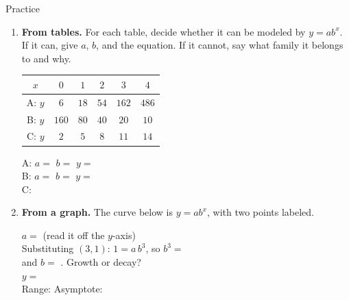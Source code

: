 \documentclass[10pt]{article}
\newcommand{\lgrid}[4]{%
  \draw[step=1, linegray!40, very thin] (#1,#3) grid (#2,#4);
  \draw[->, semithick, charcoal] (#1,0)--(#2,0) node[below right, font=\scriptsize]{$x$};
  \draw[->, semithick, charcoal] (0,#3)--(0,#4) node[left, font=\scriptsize]{$y$};}
\newcommand{\expcurve}[4]{\draw[very thick, forest, domain=#3:#4, samples=120, smooth]
  plot (\x,{#1*exp((#2)*(\x))});}
\begin{document}
\begin{notesbox}{Practice}
\begin{enumerate}[leftmargin=1.9em, itemsep=12pt]
  \item \textbf{From tables.} For each table, decide whether it can be modeled by $y=ab^{x}$. If it
    can, give $a$, $b$, and the equation. If it cannot, say what family it belongs to and why.
    \begin{center}
    \renewcommand{\arraystretch}{1.25}
    \begin{tabular}{|c|c|c|c|c|c|}
    \hline
    $x$ & $0$ & $1$ & $2$ & $3$ & $4$ \\ \hline
    A: $y$ & $6$ & $18$ & $54$ & $162$ & $486$ \\ \hline
    B: $y$ & $160$ & $80$ & $40$ & $20$ & $10$ \\ \hline
    C: $y$ & $2$ & $5$ & $8$ & $11$ & $14$ \\ \hline
    \end{tabular}
    \end{center}
    A: \; $a=$ \blank{1.3cm} \quad $b=$ \blank{1.3cm} \quad $y=$ \blank{3.2cm} \\[3pt]
    B: \; $a=$ \blank{1.3cm} \quad $b=$ \blank{1.3cm} \quad $y=$ \blank{3.2cm} \\[3pt]
    C: \; \blank{9.0cm}

  \item \textbf{From a graph.} The curve below is $y=ab^{x}$, with two points labeled.
    \begin{center}
    \begin{minipage}[c]{0.42\linewidth}
    \centering
    \end{minipage}
    \begin{minipage}[c]{0.54\linewidth}
    $a=$ \blank{1.8cm} \; (read it off the $y$-axis) \\[6pt]
    Substituting $(3,1)$: \; $1=a\,b^{3}$, so $b^{3}=$ \blank{1.4cm} \\[6pt]
    and $b=$ \blank{1.4cm}. \quad Growth or decay? \blank{1.8cm} \\[6pt]
    $y=$ \blank{3.0cm} \\[6pt]
    Range: \blank{2.2cm} \quad Asymptote: \blank{2.0cm}
    \end{minipage}
    \end{center}


\end{enumerate}
\end{notesbox}
\end{document}
